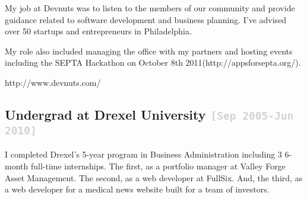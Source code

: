 \documentclass{tufte-handout}
\newcommand{\shstandout}[1]{\textbf{\textcolor{BurntOrange}{#1}}}
\newcommand{\shyears}[1]{\small{\texttt{\textcolor{LightGray}{#1}}}}
\begin{document}
My job at Devnuts was to listen to the members of our community and provide guidance related to software development and business planning. I've advised over 50 startups and entrepreneurs in Philadelphia.

My role also included managing the office with my partners and hosting events including the SEPTA Hackathon on October 8th 2011(http://appsforsepta.org/).

http://www.devnuts.com/


\subsection{\textbf{Undergrad} at \shstandout{Drexel University} \shyears{[Sep 2005-Jun 2010]}}
I completed Drexel's 5-year program in Business Administration including 3 6-month full-time internships. The first, as a portfolio manager at Valley Forge Asset Management. The second, as a web developer at FullSix. And, the third, as a web developer for a medical news website built for a team of investors.
\end{document}
